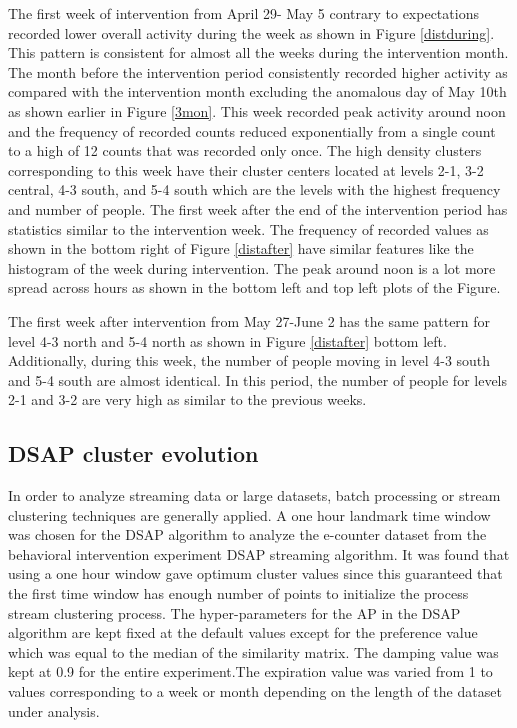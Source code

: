The first week of intervention from April 29- May 5 contrary to expectations recorded lower overall activity during the week as shown in Figure \ref{distduring}. This pattern is consistent for almost all the weeks during the intervention month. The month before the intervention period consistently recorded higher activity as compared with the intervention month excluding the anomalous day of May 10th as shown earlier in Figure \ref{3mon}. This week recorded peak activity around noon and the frequency of recorded counts reduced exponentially from a single count to a high of 12 counts that was recorded only once. The high density clusters corresponding to this week have their cluster centers located at levels 2-1, 3-2 central, 4-3 south, and 5-4 south which are the levels with the highest frequency and number of people. The first week after the end of the intervention period has statistics similar to the intervention week. The frequency of recorded values as shown in the bottom right of Figure \ref{distafter} have similar features like the histogram of the week during intervention. The peak around noon is a lot more spread across hours as shown in the bottom left and top left plots of the Figure.

The first week after intervention from May 27-June 2 has the same pattern for level 4-3 north and  5-4 north as shown in Figure \ref{distafter} bottom left. Additionally, during this week, the number of people moving in level 4-3 south and 5-4 south are almost identical. In this period, the number of people for levels 2-1 and 3-2 are very high as similar to the previous weeks. 
\subsection{DSAP cluster evolution}

In order to analyze streaming data or large datasets, batch processing or stream clustering techniques are generally applied. A one hour landmark time window was chosen for the DSAP algorithm to analyze the e-counter dataset from the behavioral intervention experiment DSAP streaming algorithm. It was found that using a one hour window gave optimum cluster values since this guaranteed that the first time window has enough number of points to initialize the process stream clustering process. The hyper-parameters for the AP in the DSAP algorithm are kept fixed at the default values except for the preference value which was equal to the median of the similarity matrix. The damping value was kept at 0.9 for the entire experiment.The expiration value was varied from 1 to values corresponding to a week or month depending on the length of the dataset under analysis.%
 
